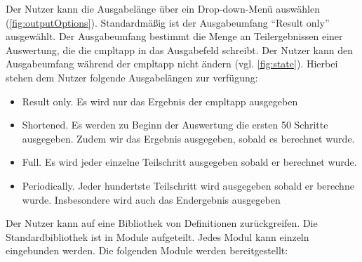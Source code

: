 \documentclass[parskip=full,11pt,twoside]{scrartcl}
\begin{document}
Der Nutzer kann die Ausgabelänge über ein Drop-down-Menü auswählen (\cref{fig:outputOptions}). 
Standardmäßig ist der Ausgabeumfang ``Result only'' ausgewählt. 
Der Ausgabeumfang bestimmt die Menge an Teilergebnissen einer Auswertung, die die \gls{cmpltapp} in das Ausgabefeld schreibt.
Der Nutzer kann den Ausgabeumfang während der \gls{cmpltapp} nicht ändern (vgl. \cref{fig:state}).
Hierbei stehen dem Nutzer folgende Ausgabelängen zur verfügung:
\begin{itemize}
	\item Result only. Es wird nur das Ergebnis der \gls{cmpltapp} ausgegeben
	\item Shortened. Es werden zu Beginn der Auswertung die ersten 50 Schritte ausgegeben.
	Zudem wir das Ergebnis ausgegeben, sobald es berechnet wurde.
	\item Full. Es wird jeder einzelne Teilschritt ausgegeben sobald er berechnet wurde.
	\item Periodically. Jeder hundertste Teilschritt wird ausgegeben sobald er berechne wurde. 
	Insbesondere wird auch das Endergebnis ausgegeben
\end{itemize}

Der Nutzer kann auf eine Bibliothek von Definitionen zurückgreifen. Die Standardbibliothek
ist in Module aufgeteilt. Jedes Modul kann einzeln eingebunden werden. Die folgenden
Module werden bereitgestellt:
\end{document}
